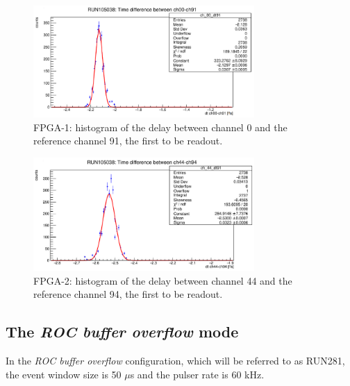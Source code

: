   \begin{figure}[!h]
          \centering
      \includegraphics[width=0.75\textwidth]{figures/png/Screenshot from 2023-12-03 11-50-50.png}
      \caption{FPGA-1: histogram of the delay between channel 0 and the reference channel 91, the first to be readout.}
      \label{fig:delay1}
    \end{figure}
    \begin{figure}[!h]
          \centering
      \includegraphics[width=0.75\textwidth]{figures/png/Screenshot from 2023-12-03 11-50-33.png}
      \caption{FPGA-2: histogram of the delay between channel 44 and the reference channel 94, the first to be readout.}
      \label{fig:delay2}
    \end{figure}
\subsection{The \textit{ROC buffer overflow} mode}
In the \textit{ROC buffer overflow} configuration, which will be referred to as RUN281, the event window size is 50 $\mu$s
and the pulser rate is 60 kHz.
